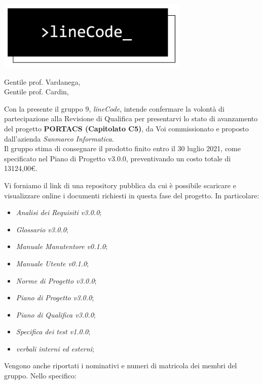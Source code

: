 \documentclass[12pt]{letter}
\date{19 luglio 2021}
\begin{document}
\begin{letter}{ }

\includegraphics[scale=0.5]{../../commons/res/lclong.png}

\opening{Gentile prof. Vardanega,\\ Gentile prof. Cardin, }

Con la presente il gruppo 9, \textit{lineCode}, intende confermare la volontà di partecipazione alla Revisione di Qualifica per presentarvi lo stato di avanzamento del progetto \textbf{PORTACS (Capitolato C5)}, da Voi commissionato e proposto dall'azienda \textit{Sanmarco Informatica}. \\
Il gruppo stima di consegnare il prodotto finito entro il 30 luglio 2021, come specificato nel Piano di Progetto v3.0.0, preventivando un costo totale di 13124,00\euro.


Vi forniamo il link di una repository pubblica da cui è possibile scaricare e visualizzare online i documenti richiesti in questa fase del progetto.
In particolare:

\begin{itemize}
	\item \textit{Analisi dei Requisiti v3.0.0};
	\item \textit{Glossario v3.0.0};
	\item \textit{Manuale Manutentore v0.1.0};
	\item \textit{Manuale Utente v0.1.0};
	\item \textit{Norme di Progetto v3.0.0};
	\item \textit{Piano di Progetto v3.0.0};
	\item \textit{Piano di Qualifica v3.0.0};
	\item \textit{Specifica dei test v1.0.0};	
	\item \textit{verbali interni ed esterni};

\end{itemize}

\newpage

Vengono anche riportati i nominativi e numeri di matricola dei membri del gruppo. Nello specifico:


\end{letter}
\end{document}
